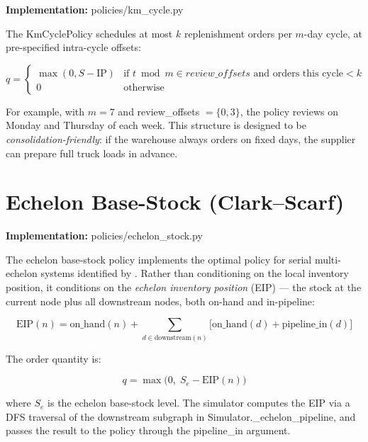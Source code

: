 \textbf{Implementation:} policies/km\_cycle.py

The KmCyclePolicy schedules at most $k$ replenishment orders per
$m$-day cycle, at pre-specified intra-cycle offsets:

\begin{equation}
  q =
  \begin{cases}
    \max(0, S - \text{IP}) & \text{if } t \bmod m \in review\_offsets
                             \text{ and orders this cycle} < k \\
    0                      & \text{otherwise}
  \end{cases}
\end{equation}

For example, with $m = 7$ and review\_offsets $= \{0, 3\}$, the
policy reviews on Monday and Thursday of each week.  This structure
is designed to be \emph{consolidation-friendly}: if the warehouse always
orders on fixed days, the supplier can prepare full truck loads in advance.

\section{Echelon Base-Stock (Clark--Scarf)}
\label{sec:policies:echelon}

\textbf{Implementation:} policies/echelon\_stock.py

The echelon base-stock policy implements the optimal policy for serial
multi-echelon systems identified by \citet{ClarkScarf1960}.  Rather than
conditioning on the local inventory position, it conditions on the
\emph{echelon inventory position} (EIP) — the stock at the current node
plus all downstream nodes, both on-hand and in-pipeline:

\begin{equation}
  \text{EIP}(n) = \text{on\_hand}(n)
                + \sum_{d \in \text{downstream}(n)}
                  \bigl[\text{on\_hand}(d) + \text{pipeline\_in}(d)\bigr]
  \label{eq:eip}
\end{equation}

The order quantity is:

\begin{equation}
  q = \max\!\bigl(0,\; S_e - \text{EIP}(n)\bigr)
\end{equation}

where $S_e$ is the echelon base-stock level.  The simulator computes
the EIP via a DFS traversal of the downstream subgraph in
Simulator.\_echelon\_pipeline, and passes the result to the
policy through the pipeline\_in argument.

